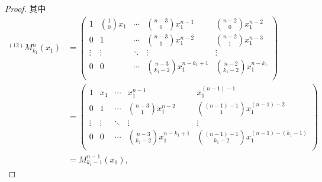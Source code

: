 \documentclass{ctexart}
\begin{document}
\begin{proof}
    其中
    \begin{align*}
        ^{(12)}M_{k_1}^n(x_1) & =\begin{pmatrix}
        1 & \binom{1}{0}x_1 & \cdots & \binom{n-3}{0}x_1^{n-1} & \binom{n-2}{0}x_1^{n-2} \\[10pt]
        0 & 1 & \cdots & \binom{n-3}{1}x_1^{n-2} & \binom{n-2}{1}x_1^{n-3} \\
        \vdots & \vdots & \ddots& \vdots  & \vdots \\[4pt]
        0 & 0 & \cdots & \binom{n-3}{k_1-2}x_1^{n-k_1+1} & \binom{n-2}{k_1-2}x_1^{n-k_1} \\
    \end{pmatrix} \\
        & =\begin{pmatrix}
        1 & x_1 & \cdots & x_1^{n-1} & x_1^{(n-1)-1} \\[6pt]
        0 & 1 & \cdots & \binom{n-3}{1}x_1^{n-2} & \binom{(n-1)-1}{1}x_1^{(n-1)-2} \\
        \vdots & \vdots & \ddots& \vdots  & \vdots \\[4pt]
        0 & 0 & \cdots & \binom{n-3}{k_1-2}x_1^{n-k_1+1} & \binom{(n-1)-1}{k_1-2}x_1^{(n-1)-(k_1-1)} \\
    \end{pmatrix} \\
        & =M_{k_1-1}^{n-1}(x_1),
    \end{align*}


\end{proof}
\end{document}

